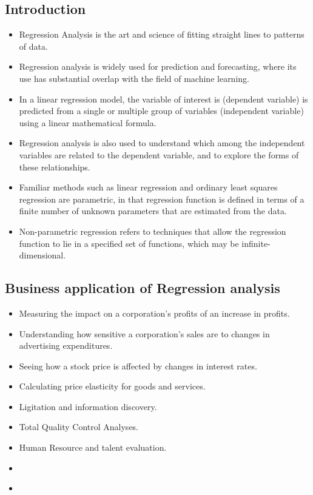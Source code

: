 \documentclass{book}
\begin{document}
\subsection{Introduction}
\begin{itemize}
\item Regression Analysis is the art and science of fitting straight lines to patterns of data.
\item Regression analysis is widely used for prediction and forecasting, where its use has substantial overlap with the field of machine learning.
\item In a linear regression model, the variable of interest is (dependent variable) is predicted from a single or multiple group of variables (independent variable) using a linear mathematical formula.
\item Regression analysis is also used to understand which among the independent variables are related to the dependent variable, and to explore the forms of these relationships.
\item Familiar methods such as linear regression and ordinary least squares regression are parametric, in that regression function is defined in terms of a finite number of unknown parameters that are estimated from the data.
\item Non-parametric regression refers to techniques that allow the regression function to lie in a specified set of functions, which may be infinite-dimensional.
\end{itemize}
\subsection{Business application of Regression analysis}
\begin{itemize}
\item Measuring the impact on a corporation's profits of an increase in profits.
\item Understanding how sensitive a corporation's sales are to changes in advertising expenditures.
\item Seeing how a stock price is affected by changes in interest rates.
\item Calculating price elasticity for goods and services.
\item Ligitation and information discovery.
\item Total Quality Control Analyses.
\item Human Resource and talent evaluation.
\end{itemize}
\begin{itemize}
\item
\end{itemize}
\begin{itemize}
\item
\end{itemize}
\end{document}
